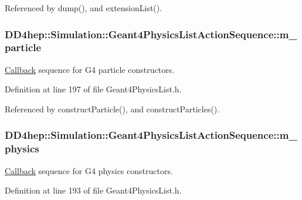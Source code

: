 Referenced by dump(), and extensionList().\hypertarget{class_d_d4hep_1_1_simulation_1_1_geant4_physics_list_action_sequence_ab83212b1da37b0e855097936968be22f}{
\subsubsection[{m\_\-particle}]{ {\bf DD4hep::Simulation::Geant4PhysicsListActionSequence::m\_\-particle}}}
\label{class_d_d4hep_1_1_simulation_1_1_geant4_physics_list_action_sequence_ab83212b1da37b0e855097936968be22f}


\hyperlink{class_d_d4hep_1_1_callback}{Callback} sequence for G4 particle constructors. 

Definition at line 197 of file Geant4PhysicsList.h.

Referenced by constructParticle(), and constructParticles().\hypertarget{class_d_d4hep_1_1_simulation_1_1_geant4_physics_list_action_sequence_a13902a9fa275fd80e465f51e1e32439f}{
\subsubsection[{m\_\-physics}]{ {\bf DD4hep::Simulation::Geant4PhysicsListActionSequence::m\_\-physics}}}
\label{class_d_d4hep_1_1_simulation_1_1_geant4_physics_list_action_sequence_a13902a9fa275fd80e465f51e1e32439f}


\hyperlink{class_d_d4hep_1_1_callback}{Callback} sequence for G4 physics constructors. 

Definition at line 193 of file Geant4PhysicsList.h.

